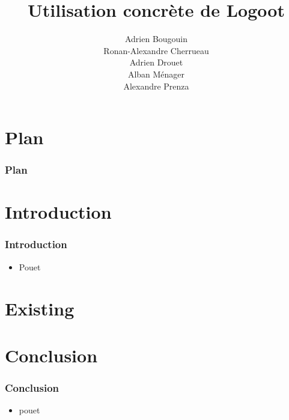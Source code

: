 \documentclass[14pt]{beamer}
\title{Utilisation concrète de Logoot}
\author{Adrien Bougouin\\
        Ronan-Alexandre Cherrueau\\
        Adrien Drouet\\
        Alban Ménager\\
        Alexandre Prenza}
\begin{document}
\begin{frame}
	\titlepage
\end{frame}

\section*{Plan}
\begin{frame}
	\frametitle{Plan}
	\tableofcontents[hideallsubsections]
\end{frame}

\section{Introduction}
	\begin{frame}
		\frametitle{Introduction}
   		\begin{itemize}
    		\item Pouet
    	\end{itemize}
	\end{frame}

\section{Existing}

	
\section{Conclusion}
	\begin{frame}
		\frametitle{Conclusion}
		\begin{itemize}
			\item pouet
		\end{itemize}
	\end{frame}
\end{document}
